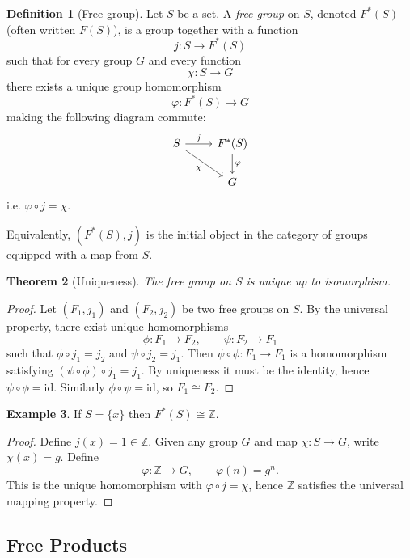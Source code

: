 \documentclass[11pt,a4paper]{article}
\theoremstyle{definition}
\newtheorem{definition}{Definition}[section]
\newtheorem{example}[definition]{Example}
\theoremstyle{plain}
\newtheorem{theorem}[definition]{Theorem}
\theoremstyle{remark}
\newcommand{\1}{\mathbbm{1}}
\begin{document}
\begin{definition}[Free group]
Let $S$ be a set. A \emph{free group} on $S$, denoted $F^*(S)$ (often written $F(S)$),
is a group together with a function
\[
j : S \to F^*(S)
\]
such that for every group $G$ and every function
\[
\chi : S \to G
\]
there exists a unique group homomorphism
\[
\varphi : F^*(S) \to G
\]
making the following diagram commute:
\[
\begin{tikzcd}
S \arrow[r,"j"] \arrow[dr,"\chi"'] & F^*(S) \arrow[d,"\varphi"] \\
& G
\end{tikzcd}
\]
i.e. $\varphi \circ j = \chi$.

Equivalently, $(F^*(S),j)$ is the initial object in the category of
groups equipped with a map from $S$.
\end{definition}

\begin{theorem}[Uniqueness]
The free group on $S$ is unique up to isomorphism.
\end{theorem}

\begin{proof}
Let $(F_1,j_1)$ and $(F_2,j_2)$ be two free groups on $S$.
By the universal property, there exist unique homomorphisms
\[
\phi : F_1 \to F_2, \qquad \psi : F_2 \to F_1
\]
such that $\phi \circ j_1 = j_2$ and $\psi \circ j_2 = j_1$.
Then $\psi\circ\phi : F_1 \to F_1$ is a homomorphism satisfying
$(\psi\circ\phi)\circ j_1 = j_1$.
By uniqueness it must be the identity, hence $\psi\circ\phi = \mathrm{id}$.
Similarly $\phi\circ\psi = \mathrm{id}$, so $F_1 \cong F_2$.
\end{proof}

\begin{example}
If $S=\{x\}$ then $F^*(S)\cong \mathbb Z$.
\end{example}

\begin{proof}
Define $j(x)=1\in \mathbb Z$. Given any group $G$ and map $\chi:S\to G$,
write $\chi(x)=g$. Define
\[
\varphi:\mathbb Z \to G, \qquad \varphi(n)=g^n.
\]
This is the unique homomorphism with $\varphi\circ j=\chi$, hence
$\mathbb Z$ satisfies the universal mapping property.
\end{proof}

\subsection*{Free Products}
\end{document}
